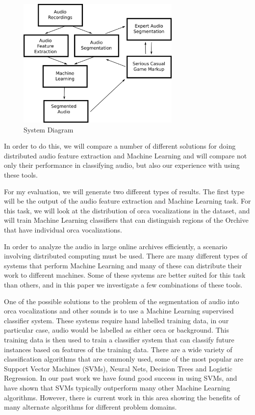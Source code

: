 \documentclass[12pt,oneside]{book}
\begin{document}
\begin{figure}
\centering
\includegraphics[width=80mm]{figures/systemDiagram}
\caption{System Diagram} 
\label{fig:systemDiagram} 
\end{figure} 

In order to do this, we will compare a number of different solutions
for doing distributed audio feature extraction and Machine Learning
and will compare not only their performance in classifying audio, but
also our experience with using these tools.

For my evaluation, we will generate two different types of results.
The first type will be the output of the audio feature extraction and
Machine Learning task. For this task, we will look at the distribution
of orca vocalizations in the dataset, and will train Machine Learning
classifiers that can distinguish regions of the Orchive that have
individual orca vocalizations.

In order to analyze the audio in large online archives efficiently, a
scenario involving distributed computing must be used.  There are many
different types of systems that perform Machine Learning and many of
these can distribute their work to different machines.  Some of these
systems are better suited for this task than others, and in this paper
we investigate a few combinations of these tools.

One of the possible solutions to the problem of the segmentation of
audio into orca vocalizations and other sounds is to use a Machine
Learning supervised classifier system.  These systems require hand
labelled training data, in our particular case, audio would be
labelled as either orca or background.  This training data is then
used to train a classifier system that can classify future instances
based on features of the training data.  There are a wide variety of
classification algorithms that are commonly used, some of the most
popular are Support Vector Machines (SVMs), Neural Nets, Decision
Trees and Logistic Regression.  In our past work we have found good
success in using SVMs, and have shown that SVMs typically outperform
many other Machine Learning algorithms.  However, there is current
work in this area showing the benefits of many alternate algorithms
for different problem domains.
\end{document}
